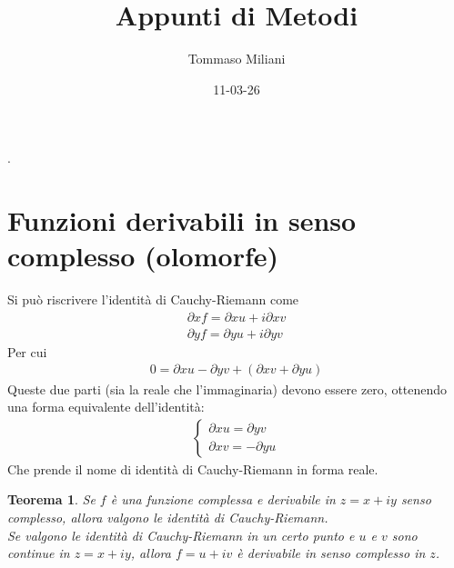 \documentclass[a4paper, oneside]{article}
\title{Appunti di Metodi}
\author{Tommaso Miliani}
\date{11-03-26}
\begin{document}
                {}          %
                {}          %
                {\slshape}  %
                {}          %
                {\bfseries} %
                {.}         %
                {\newline}  %
                {}          %
\theoremstyle{theoremEnv}

\newtheorem{definition}{Definizione}[section]
\newtheorem{theorem}{Teorema}[section]
\newtheorem{lemma}{Proposizione}[section]
\newtheorem{observation}{Osservazione}[section]
\newtheorem{corollary}{Corollario}[theorem]
\newtheorem{example}{Esempio}[section]
\newtheorem{remark}{Enunciato}[section]

\maketitle

\section{Funzioni derivabili in senso complesso (olomorfe)}
Si può riscrivere l'identità di Cauchy-Riemann come
\begin{gather*}
    \partial x f = \partial x u + i \partial x v \\
    \partial y f = \partial y u + i \partial y v
\end{gather*}
Per cui
\begin{gather*}
    0 = \partial x u - \partial y v + (\partial x v + \partial y u)
\end{gather*}
Queste due parti (sia la reale che l'immaginaria) devono essere zero, 
ottenendo una forma equivalente dell'identità:
\begin{gather*}
    \left\{\begin{array}{l}
        \partial x u = \partial y v \\
        \partial x v = - \partial y u
    \end{array}\right.
\end{gather*}
Che prende il nome di identità di Cauchy-Riemann in forma reale.

\begin{theorem}
    Se $f$ è una funzione complessa e derivabile in $z = x + iy$ senso complesso, 
    allora valgono le identità di Cauchy-Riemann. \\
    Se valgono le identità di Cauchy-Riemann in un certo punto e
    $u$ e $v$ sono continue in $z = x + iy$, allora $f = u + iv$ è
    derivabile in senso complesso in $z$. 
\end{theorem}
\end{document}
